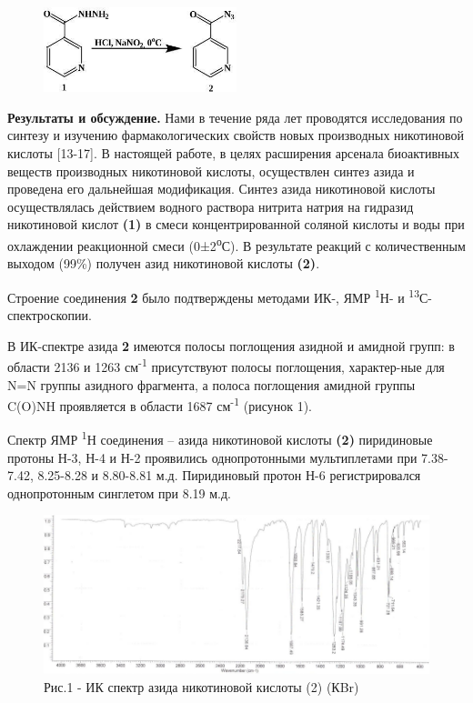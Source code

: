 \begin{figure}[H]
	\centering
	\includegraphics[width=0.5\textwidth]{assets/1}
\end{figure}

\begin{multicols}{2}
{\bfseries Результаты и обсуждение.} Нами в течение ряда лет проводятся
исследования по синтезу и изучению фармакологических свойств новых
производных никотиновой кислоты {[}13-17{]}. В настоящей работе, в целях
расширения арсенала биоактивных веществ производных никотиновой кислоты,
осуществлен синтез азида и проведена его дальнейшая модификация. Синтез
азида никотиновой кислоты осуществлялась действием водного раствора
нитрита натрия на гидразид никотиновой кислот {\bfseries (1)} в смеси
концентрированной соляной кислоты и воды при охлаждении реакционной
смеси (0±2\textsuperscript{о}С). В результате реакций с количественным
выходом (99\%) получен азид никотиновой кислоты {\bfseries (2)}.

Строение соединения {\bfseries 2} было подтверждены методами ИК-, ЯМР
\textsuperscript{1}Н- и \textsuperscript{13}С-спектроскопии.

В ИК-спектре азида {\bfseries 2} имеются полосы поглощения азидной и
амидной групп: в области 2136 и 1263 см\textsuperscript{-1} присутствуют
полосы поглощения, характер-ные для N=N группы азидного фрагмента, а
полоса поглощения амидной группы C(O)NH проявляется в области 1687
см\textsuperscript{-1} (рисунок 1).

Спектр ЯМР \textsuperscript{1}Н соединения -- азида никотиновой кислоты
{\bfseries (2)} пиридиновые протоны Н-3, Н-4 и Н-2 проявились
однопротонными мультиплетами при 7.38-7.42, 8.25-8.28 и 8.80-8.81 м.д.
Пиридиновый протон Н-6 регистрировался однопротонным синглетом при 8.19
м.д.
\end{multicols}

\begin{figure}[H]
	\centering
	\includegraphics[width=\textwidth]{assets/2}
	\caption*{Рис.1 - ИК спектр азида никотиновой кислоты (2) (КBr)}
\end{figure}

